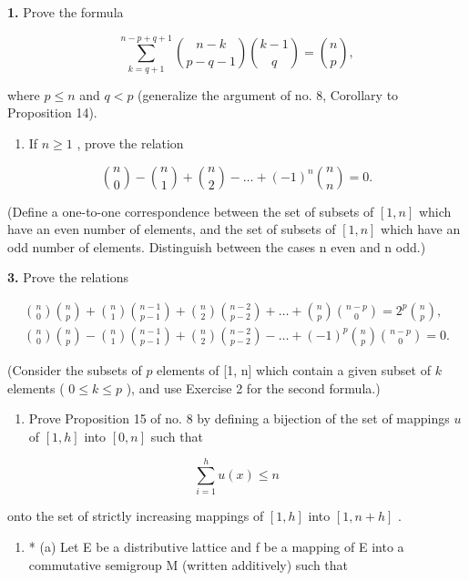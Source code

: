 \exercisegroup

\textbf{1.} Prove the formula

\[
\sum_ {k = q + 1} ^ {n - p + q + 1} \binom {n - k} {p - q - 1} \binom {k - 1} {q} = \binom {n} {p},
\]

where \(p \leqslant n\) and \(q < p\) (generalize the argument of no. 8, Corollary to Proposition 14).

\begin{enumerate}
\def\labelenumi{\arabic{enumi}.}
\setcounter{enumi}{1}
\tightlist
\item
  If \(n \geqslant 1\) , prove the relation
\end{enumerate}

\[
\binom {n} {0} - \binom {n} {1} + \binom {n} {2} - \dots + (- 1) ^ {n} \binom {n} {n} = 0.
\]

(Define a one-to-one correspondence between the set of subsets of \([1, n]\) which have an even number of elements, and the set of subsets of \([1, n]\) which have an odd number of elements. Distinguish between the cases n even and n odd.)

\textbf{3.} Prove the relations

\[
\begin{array}{l} \binom {n} {0} \binom {n} {p} + \binom {n} {1} \binom {n - 1} {p - 1} + \binom {n} {2} \binom {n - 2} {p - 2} + \dots + \binom {n} {p} \binom {n - p} {0} = 2 ^ {p} \binom {n} {p}, \\ \binom {n} {0} \binom {n} {p} - \binom {n} {1} \binom {n - 1} {p - 1} + \binom {n} {2} \binom {n - 2} {p - 2} - \dots + (- 1) ^ {p} \binom {n} {p} \binom {n - p} {0} = 0. \end{array}
\]

(Consider the subsets of \(p\) elements of {[}1, n{]} which contain a given subset of \(k\) elements ( \(0 \leqslant k \leqslant p\) ), and use Exercise 2 for the second formula.)

\begin{enumerate}
\def\labelenumi{\arabic{enumi}.}
\setcounter{enumi}{3}
\tightlist
\item
  Prove Proposition 15 of no. 8 by defining a bijection of the set of mappings \(u\) of \([1, h]\) into \([0, n]\) such that
\end{enumerate}

\[
\sum_ {i = 1} ^ {h} u (x) \leqslant n
\]

onto the set of strictly increasing mappings of \([1, h]\) into \([1, n + h]\) .

\begin{enumerate}
\def\labelenumi{\arabic{enumi}.}
\setcounter{enumi}{4}
\tightlist
\item
  * (a) Let E be a distributive lattice and f be a mapping of E into a commutative semigroup M (written additively) such that
\end{enumerate}

